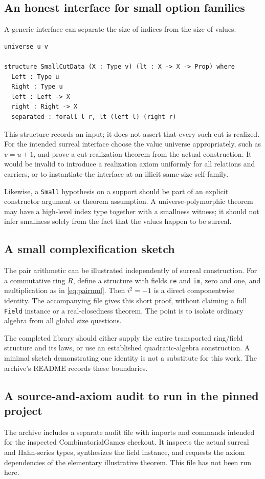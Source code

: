 \documentclass[11pt,letterpaper]{article}
\theoremstyle{definition}
\theoremstyle{remark}
\numberwithin{equation}{section}
\begin{document}
\subsection{An honest interface for small option families}
A generic interface can separate the size of indices from the size of values:
\begin{lstlisting}
universe u v

structure SmallCutData (X : Type v) (lt : X -> X -> Prop) where
  Left : Type u
  Right : Type u
  left : Left -> X
  right : Right -> X
  separated : forall l r, lt (left l) (right r)
\end{lstlisting}
This structure records an input; it does not assert that every such cut is realized. For the intended surreal interface choose the value universe appropriately, such as \(v=u+1\), and prove a cut-realization theorem from the actual construction. It would be invalid to introduce a realization axiom uniformly for all relations and carriers, or to instantiate the interface at an illicit same-size self-family.

Likewise, a \texttt{Small} hypothesis on a support should be part of an explicit constructor argument or theorem assumption. A universe-polymorphic theorem may have a high-level index type together with a smallness witness; it should not infer smallness solely from the fact that the values happen to be surreal.

\subsection{A small complexification sketch}
The pair arithmetic can be illustrated independently of surreal construction. For a commutative ring \(R\), define a structure with fields \texttt{re} and \texttt{im}, zero and one, and multiplication as in \eqref{eq:pairmul}. Then \(i^2=-1\) is a direct componentwise identity. The accompanying file gives this short proof, without claiming a full \texttt{Field} instance or a real-closedness theorem. The point is to isolate ordinary algebra from all global size questions.

The completed library should either supply the entire transported ring/field structure and its laws, or use an established quadratic-algebra construction. A minimal sketch demonstrating one identity is not a substitute for this work. The archive's README records these boundaries.

\subsection{A source-and-axiom audit to run in the pinned project}
The archive includes a separate audit file with imports and commands intended for the inspected CombinatorialGames checkout. It inspects the actual surreal and Hahn-series types, synthesizes the field instance, and requests the axiom dependencies of the elementary illustrative theorem. This file has not been run here.
\end{document}
